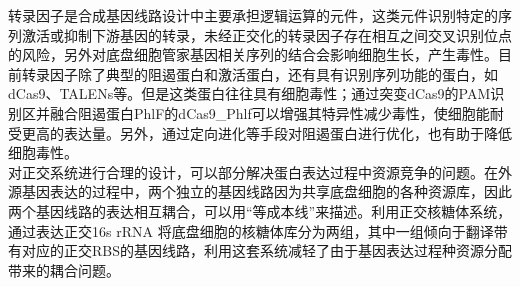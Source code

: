 \documentclass[b5paper,11pt,onecolumn,twoside,UTF8]{article}
\begin{document}
\indent 转录因子是合成基因线路设计中主要承担逻辑运算的元件，这类元件识别特定的序列激活或抑制下游基因的转录，未经正交化的转录因子存在相互之间交叉识别位点的风险，另外对底盘细胞管家基因相关序列的结合会影响细胞生长，产生毒性。目前转录因子除了典型的阻遏蛋白和激活蛋白，还有具有识别序列功能的蛋白，如dCas9、TALENs等。但是这类蛋白往往具有细胞毒性；通过突变dCas9的PAM识别区并融合阻遏蛋白PhlF的dCas9\_Phlf可以增强其特异性减少毒性，使细胞能耐受更高的表达量。另外，通过定向进化等手段对阻遏蛋白进行优化，也有助于降低细胞毒性\cite{Meyer2018}。\\
\indent 对正交系统进行合理的设计，可以部分解决蛋白表达过程中资源竞争的问题。在外源基因表达的过程中，两个独立的基因线路因为共享底盘细胞的各种资源库，因此两个基因线路的表达相互耦合，可以用“等成本线”来描述。利用正交核糖体系统，通过表达正交16s rRNA 将底盘细胞的核糖体库分为两组，其中一组倾向于翻译带有对应的正交RBS的基因线路，利用这套系统减轻了由于基因表达过程种资源分配带来的耦合问题\cite{Darlington2018}。
\end{document}
